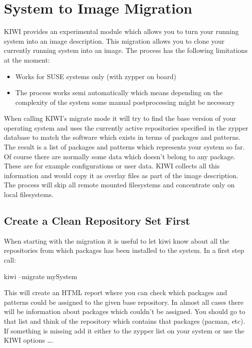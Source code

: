 \chapter{System to Image Migration}
\label{chapter:migration}
\minitoc

KIWI provides an experimental module which allows you to turn your
running system into an image description. This migration allows you
to clone your currently running system into an image. The process
has the following limitations at the moment:

\begin{itemize}
\item Works for SUSE systems only (with zypper on board)
\item The process works semi automatically which means depending
      on the complexity of the system some manual postprocessing might
      be necessary
\end{itemize}

When calling KIWI's migrate mode it will try to find the base version
of your operating system and uses the currently active repositories
specified in the zypper database to match the software which exists
in terms of packages and patterns. The result is a list of packages
and patterns which represents your system so far. Of course there are
normally some data which doesn't belong to any package. These are
for example configurations or user data. KIWI collects all this
information and would copy it as overlay files as part of the image
description. The process will skip all remote mounted filesystems
and concentrate only on local filesystems.

\section{Create a Clean Repository Set First}
When starting with the migration it is useful to let kiwi know about all
the repositories from which packages has been installed to 
the system. In a first step call:

\begin{Command}{12cm}
kiwi --migrate mySystem
\end{Command}

This will create an HTML report where you can check which packages and
patterns could be assigned to the given base repository. In almost
all cases there will be information about packages which couldn't
be assigned. You should go to that list and think of the repository
which contains that packages (pacman, etc). If something is missing
add it either to the zypper list on your system or use the KIWI
options  \ldots {}.

